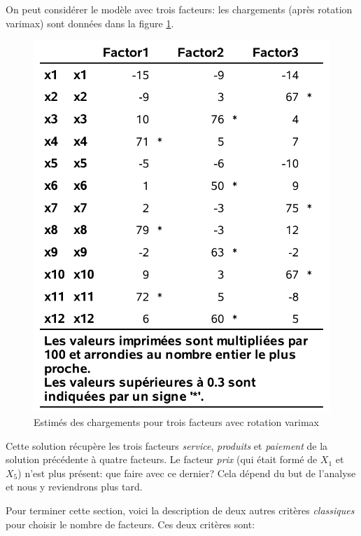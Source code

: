 \documentclass[
  11pt,
  letterpaper,
]{book}
\theoremstyle{definition}
\theoremstyle{definition}
\theoremstyle{definition}
\theoremstyle{remark}
\begin{document}
On peut considérer le modèle avec trois facteurs: les chargements (après rotation varimax) sont données dans la figure \ref{fig:fig1p5}.

\begin{figure}

{\centering \includegraphics[width=0.55\linewidth]{figures/01-facto-e5} 

}

\caption{Estimés des chargements pour trois facteurs avec rotation varimax}\label{fig:fig1p5}
\end{figure}

Cette solution récupère les trois facteurs \emph{service}, \emph{produits} et \emph{paiement} de la solution précédente à quatre facteurs. Le facteur \emph{prix} (qui était formé de \(X_1\) et \(X_5\)) n'est plus présent: que faire avec ce dernier? Cela dépend du but de l'analyse et nous y reviendrons plus tard.

Pour terminer cette section, voici la description de deux autres
critères \emph{classiques} pour choisir le nombre de facteurs. Ces deux critères sont:
\end{document}
